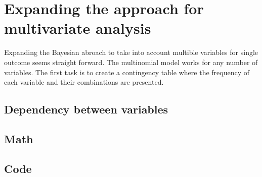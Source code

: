 \chapter{Expanding the approach for multivariate analysis} \label{Expanding}
Expanding the Bayesian abroach to take into account multible variables for single outcome seems straight forward. The multinomial model works for any number of variables. The first task is to create a contingency table where the frequency of each variable and their combinations are presented. 

\section{Dependency between variables}


\section{Math}\label{Math}
\section{Code}\label{Code}
